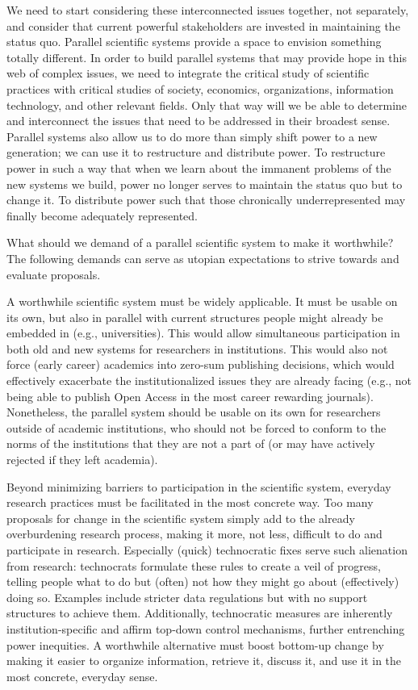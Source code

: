 \documentclass[a5paper]{book}
\begin{document}
We need to start considering these interconnected issues together, not
separately, and consider that current powerful stakeholders are invested
in maintaining the status quo. Parallel scientific systems provide a
space to envision something totally different. In order to build
parallel systems that may provide hope in this web of complex issues, we
need to integrate the critical study of scientific practices with
critical studies of society, economics, organizations, information
technology, and other relevant fields. Only that way will we be able to
determine and interconnect the issues that need to be addressed in their
broadest sense. Parallel systems also allow us to do more than simply
shift power to a new generation; we can use it to restructure and
distribute power. To restructure power in such a way that when we learn
about the immanent problems of the new systems we build, power no longer
serves to maintain the status quo but to change it. To distribute power
such that those chronically underrepresented may finally become
adequately represented.

What should we demand of a parallel scientific system to make it
worthwhile? The following demands can serve as utopian expectations to
strive towards and evaluate proposals.

A worthwhile scientific system must be widely applicable. It must be
usable on its own, but also in parallel with current structures people
might already be embedded in (e.g., universities). This would allow
simultaneous participation in both old and new systems for researchers
in institutions. This would also not force (early career) academics into
zero-sum publishing decisions, which would effectively exacerbate the
institutionalized issues they are already facing (e.g., not being able
to publish Open Access in the most career rewarding journals).
Nonetheless, the parallel system should be usable on its own for
researchers outside of academic institutions, who should not be forced
to conform to the norms of the institutions that they are not a part of
(or may have actively rejected if they left academia).

Beyond minimizing barriers to participation in the scientific system,
everyday research practices must be facilitated in the most concrete
way. Too many proposals for change in the scientific system simply add
to the already overburdening research process, making it more, not less,
difficult to do and participate in research. Especially (quick)
technocratic fixes serve such alienation from research: technocrats
formulate these rules to create a veil of progress, telling people what
to do but (often) not how they might go about (effectively) doing so.
Examples include stricter data regulations but with no support
structures to achieve them. Additionally, technocratic measures are
inherently institution-specific and affirm top-down control mechanisms,
further entrenching power inequities. A worthwhile alternative must
boost bottom-up change by making it easier to organize information,
retrieve it, discuss it, and use it in the most concrete, everyday
sense.
\end{document}
